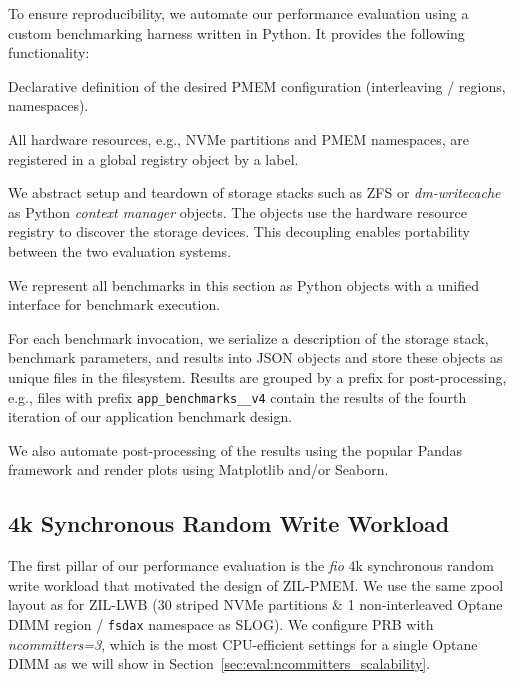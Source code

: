 \documentclass[12pt,a4paper,twoside]{book}
\begin{document}
{To ensure reproducibility, we automate our performance evaluation using a custom benchmarking harness written in Python.
It provides the following functionality:
\begin{description}[noitemsep]
    \item[Declarative PMEM Provisioning] Declarative definition of the desired PMEM configuration (interleaving / regions, namespaces).
    \item[Hardware Resource Registry]  All hardware resources, e.g., NVMe partitions and PMEM namespaces, are registered in a global registry object by a label.
    \item[Unified Storage Software Configuration] We abstract setup and teardown of storage stacks such as ZFS or \textit{dm-writecache} as Python \textit{context manager} objects.
        The objects use the hardware resource registry to discover the storage devices.
        This decoupling enables portability between the two evaluation systems.
    \item[Unified Benchmark Abstraction] We represent all benchmarks in this section as Python objects with a unified interface for benchmark execution.
    \item[Result Storage] For each benchmark invocation, we serialize a description of the storage stack, benchmark parameters, and results into JSON objects and store these objects as unique files in the filesystem.
        Results are grouped by a prefix for post-processing, e.g., files with prefix \lstinline{app_benchmarks__v4} contain the results of the fourth iteration of our application benchmark design.
\end{description}
We also automate post-processing of the results using the popular Pandas framework and render plots using Matplotlib and/or Seaborn.

\subsection{4k Synchronous Random Write Workload}\label{sec:eval:4ksyncwrites}
The first pillar of our performance evaluation is the \textit{fio} 4k synchronous random write workload that motivated the design of ZIL-PMEM.
We use the same zpool layout as for ZIL-LWB (30 striped NVMe partitions \& 1 non-interleaved Optane DIMM region / \lstinline{fsdax} namespace as SLOG).
We configure PRB with \textit{ncommitters=3}, which is the most CPU-efficient settings for a single Optane DIMM as we will show in Section~\ref{sec:eval:ncommitters_scalability}.

}
\end{document}
